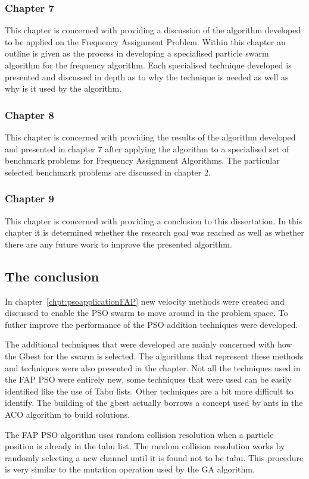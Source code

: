 \subsubsection{Chapter 7}
This chapter is concerned with providing a discussion of the algorithm developed to be applied on the Frequency Assignment Problem. Within this chapter an outline is given as the process in developing a specialised particle swarm algorithm for the frequency algorithm. Each specialised technique developed is presented and discussed in depth as to why the technique is needed as well as why is it used by the algorithm.
\subsubsection{Chapter 8}
This chapter is concerned with providing the results of the algorithm developed and presented in chapter 7 after applying the algorithm to a specialised set of benchmark problems for Frequency Assignment Algorithms. The particular selected benchmark problems are discussed in chapter 2.
\subsubsection{Chapter 9}
This chapter is concerned with providing a conclusion to this dissertation. In this chapter it is determined whether the research goal was reached as well as whether there are any future work to improve the presented algorithm.
\subsection{The conclusion}
In chapter~\ref{chpt:psoapplicationFAP} new velocity methods were created and discussed to enable the PSO swarm to move around in the problem space. To futher improve the performance of the PSO addition techniques were developed.

The additional techniques that were developed are mainly concerned with how the Gbest for the swarm is selected. The algorithms that represent these methods and techniques were also presented in the chapter. Not all the techniques used in the FAP PSO were entirely new, some techniques that were used can be easily identified like the use of Tabu lists. Other techniques are a bit more difficult to identify. The building of the gbest actually borrows a concept used by ants in the ACO algorithm to build solutions. 

The FAP PSO algorithm uses random collision resolution when a particle position is already in the tabu list. The random collision resolution works by randomly selecting a new channel until it is found not to be tabu. This procedure is very similar to the mutation operation used by the GA algorithm.


